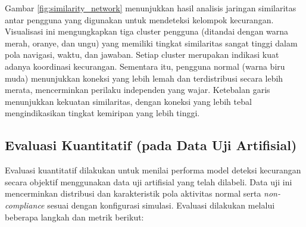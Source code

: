 Gambar \ref{fig:similarity_network} menunjukkan hasil analisis jaringan similaritas antar pengguna yang digunakan untuk mendeteksi kelompok kecurangan. Visualisasi ini mengungkapkan tiga cluster pengguna (ditandai dengan warna merah, oranye, dan ungu) yang memiliki tingkat similaritas sangat tinggi dalam pola navigasi, waktu, dan jawaban. Setiap cluster merupakan indikasi kuat adanya koordinasi kecurangan. Sementara itu, pengguna normal (warna biru muda) menunjukkan koneksi yang lebih lemah dan terdistribusi secara lebih merata, mencerminkan perilaku independen yang wajar. Ketebalan garis menunjukkan kekuatan similaritas, dengan koneksi yang lebih tebal mengindikasikan tingkat kemiripan yang lebih tinggi.

\subsection{Evaluasi Kuantitatif (pada Data Uji Artifisial)}
\label{sec:evaluasiKuantitatifDataUjiArtifisial}
Evaluasi kuantitatif dilakukan untuk menilai performa model deteksi kecurangan secara objektif menggunakan data uji artifisial yang telah dilabeli. Data uji ini mencerminkan distribusi dan karakteristik pola aktivitas normal serta \textit{non-compliance} sesuai dengan konfigurasi simulasi. Evaluasi dilakukan melalui beberapa langkah dan metrik berikut:


